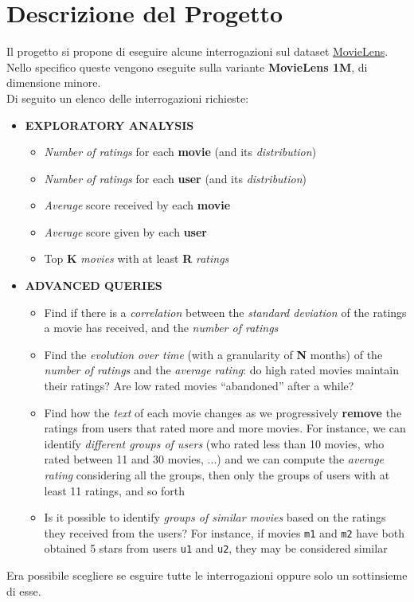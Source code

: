 \documentclass{article}
\begin{document}
    \section{Descrizione del Progetto}
        Il progetto si propone di eseguire alcune interrogazioni sul dataset \href{https://grouplens.org/datasets/movielens/}{MovieLens}. Nello specifico queste vengono eseguite sulla variante \textbf{MovieLens 1M}, di dimensione minore.\\
        Di seguito un elenco delle interrogazioni richieste:
        \begin{itemize}
            \item \textbf{EXPLORATORY ANALYSIS}
                  \begin{itemize}
                    \item \textit{Number of ratings} for each \textbf{movie} (and its \textit{distribution})
                    \item \textit{Number of ratings} for each \textbf{user} (and its \textit{distribution})
                    \item \textit{Average} score received by each \textbf{movie}
                    \item \textit{Average} score given by each \textbf{user}
                    \item Top \textbf{K} \textit{movies} with at least \textbf{R} \textit{ratings}
                  \end{itemize}
            \item \textbf{ADVANCED QUERIES}
                  \begin{itemize}
                    \item Find if there is a \textit{correlation} between the \textit{standard deviation} of the ratings a movie has received, and the \textit{number of ratings}
                    \item Find the \textit{evolution over time} (with a granularity of \textbf{N} months) of the \textit{number of ratings} and the \textit{average rating}: do high rated movies maintain their ratings? Are low rated movies “abandoned” after a while?
                    \item Find how the \textit{text} of each movie changes as we progressively \textbf{remove} the ratings from users that rated more and more movies. For instance, we can identify \textit{different groups of users} (who rated less than 10 movies, who rated between 11 and 30 movies, ...) and we can compute the \textit{average rating} considering all the groups, then only the groups of users with at least 11 ratings, and so forth
                    \item Is it possible to identify \textit{groups of similar movies} based on the ratings they received from the users? For instance, if movies \texttt{m1} and \texttt{m2} have both obtained 5 stars from users \texttt{u1} and \texttt{u2}, they may be considered similar
                  \end{itemize}
        \end{itemize}
        Era possibile scegliere se esguire tutte le interrogazioni oppure solo un sottinsieme di esse.
\end{document}
